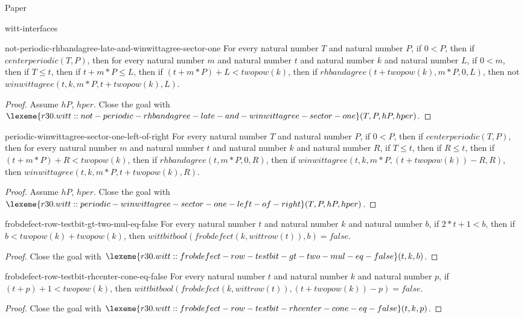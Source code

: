 \begin{lexlean}{Paper}
\begin{section}{witt-interfaces}
  \begin{theorem}{not-periodic-rhbandagree-late-and-winwittagree-sector-one}
  For every natural number \(T\) and natural number \(P\), if \(0 < P\), then if \(centerperiodic(T, P)\), then for every natural number \(m\) and natural number \(t\) and natural number \(k\) and natural number \(L\), if \(0 < m\), then if \(T ≤ t\), then if \(t + m * P ≤ L\), then if \((t + m * P) + L < twopow(k)\), then if \(rhbandagree(t + twopow(k), m * P, 0, L)\), then not \(winwittagree(t, k, m * P, t + twopow(k), L)\).
  \begin{proof}
  Assume \(hP\), \(hper\).
  Close the goal with \(\lexeme{r30.witt::not-periodic-rhbandagree-late-and-winwittagree-sector-one}(T, P, hP, hper)\).
  \end{proof}
  \end{theorem}

  \begin{theorem}{periodic-winwittagree-sector-one-left-of-right}
  For every natural number \(T\) and natural number \(P\), if \(0 < P\), then if \(centerperiodic(T, P)\), then for every natural number \(m\) and natural number \(t\) and natural number \(k\) and natural number \(R\), if \(T ≤ t\), then if \(R ≤ t\), then if \((t + m * P) + R < twopow(k)\), then if \(rhbandagree(t, m * P, 0, R)\), then if \(winwittagree(t, k, m * P, (t + twopow(k)) - R, R)\), then \(winwittagree(t, k, m * P, t + twopow(k), R)\).
  \begin{proof}
  Assume \(hP\), \(hper\).
  Close the goal with \(\lexeme{r30.witt::periodic-winwittagree-sector-one-left-of-right}(T, P, hP, hper)\).
  \end{proof}
  \end{theorem}

  \begin{theorem}{frobdefect-row-testbit-gt-two-mul-eq-false}
  For every natural number \(t\) and natural number \(k\) and natural number \(b\), if \(2 * t + 1 < b\), then if \(b < twopow(k) + twopow(k)\), then \(wittbitbool(frobdefect(k, wittrow(t)), b) = false\).
  \begin{proof}
  Close the goal with \(\lexeme{r30.witt::frobdefect-row-testbit-gt-two-mul-eq-false}(t, k, b)\).
  \end{proof}
  \end{theorem}

  \begin{theorem}{frobdefect-row-testbit-rhcenter-cone-eq-false}
  For every natural number \(t\) and natural number \(k\) and natural number \(p\), if \((t + p) + 1 < twopow(k)\), then \(wittbitbool(frobdefect(k, wittrow(t)), (t + twopow(k)) - p) = false\).
  \begin{proof}
  Close the goal with \(\lexeme{r30.witt::frobdefect-row-testbit-rhcenter-cone-eq-false}(t, k, p)\).
  \end{proof}
  \end{theorem}


\end{section}
\end{lexlean}
